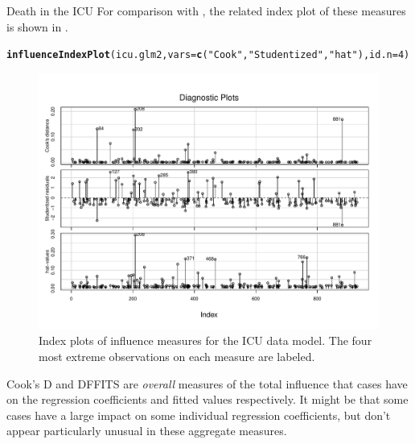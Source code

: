 \documentclass[11pt]{book}\usepackage[]{graphicx}\usepackage[]{color}
\makeatletter
\newcommand{\hlnum}[1]{\textcolor[rgb]{0.686,0.059,0.569}{#1}}%
\newcommand{\hlstr}[1]{\textcolor[rgb]{0.192,0.494,0.8}{#1}}%
\newcommand{\hlstd}[1]{\textcolor[rgb]{0.345,0.345,0.345}{#1}}%
\newcommand{\hlkwc}[1]{\textcolor[rgb]{0.333,0.667,0.333}{#1}}%
\newcommand{\hlkwd}[1]{\textcolor[rgb]{0.737,0.353,0.396}{\textbf{#1}}}%
\newenvironment{kframe}{%
 \def\at@end@of@kframe{}%
 \ifinner\ifhmode%
  \def\at@end@of@kframe{\end{minipage}}%
  \begin{minipage}{\columnwidth}%
 \fi\fi%
 \def\FrameCommand##1{\hskip\@totalleftmargin \hskip-\fboxsep
 \colorbox{shadecolor}{##1}\hskip-\fboxsep
     \hskip-\linewidth \hskip-\@totalleftmargin \hskip\columnwidth}%
 \MakeFramed {\advance\hsize-\width
   \@totalleftmargin\z@ \linewidth\hsize
   \@setminipage}}%
 {\par\unskip\endMakeFramed%
 \at@end@of@kframe}
\newenvironment{knitrout}{}{} %
\renewenvironment{knitrout}{\small\renewcommand{\baselinestretch}{.85}}{} %
\makeatother
\begin{document}
\begin{Example}[icu2]{Death in the ICU}
For comparison with , the related index plot of
these measures is shown in .

\begin{knitrout}
\color{fgcolor}\begin{kframe}
\begin{alltt}
\hlkwd{influenceIndexPlot}\hlstd{(icu.glm2,} \hlkwc{vars}\hlstd{=}\hlkwd{c}\hlstd{(}\hlstr{"Cook"}\hlstd{,} \hlstr{"Studentized"}\hlstd{,} \hlstr{"hat"}\hlstd{),} \hlkwc{id.n}\hlstd{=}\hlnum{4}\hlstd{)}
\end{alltt}
\end{kframe}\begin{figure}[!htbp]


\centerline{\includegraphics[width=.8\textwidth]{ch07/fig/icu2-infl-index-1} }

\caption[Index plots of influence measures for the ICU data model]{Index plots of influence measures for the ICU data model. The four most extreme observations on each measure are labeled.\label{fig:icu2-infl-index}}
\end{figure}


\end{knitrout}

Cook's D and DFFITS are \emph{overall} measures of the total influence that cases have
on the regression coefficients and fitted values respectively.
It might be that some cases have a large impact on some individual regression coefficients,
but don't appear particularly unusual in these aggregate measures.


\end{Example}
\end{document}
